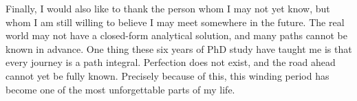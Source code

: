 Finally, I would also like to thank the person whom I may not yet know,
but whom I am still willing to believe I may meet somewhere in the future.
The real world may not have a closed-form analytical solution, and many paths cannot be known in advance.
One thing these six years of PhD study have taught me is that every journey is a path integral.
Perfection does not exist, and the road ahead cannot yet be fully known.
Precisely because of this, this winding period has become one of the most unforgettable parts of my life.
